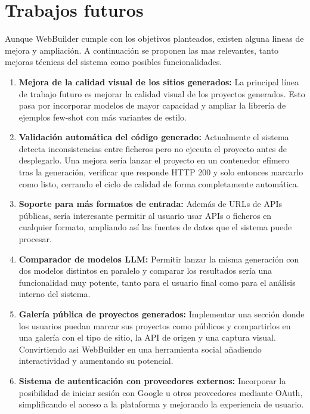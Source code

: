 \section{Trabajos futuros}
\label{sec:trabajos_futuros}

Aunque WebBuilder cumple con los objetivos planteados, existen alguna lineas de mejora y ampliación. A continuación se proponen las mas relevantes, tanto mejoras técnicas del sistema como posibles funcionalidades.

\begin{enumerate}
  \item \textbf{Mejora de la calidad visual de los sitios generados:} La principal línea de trabajo futuro es mejorar la calidad visual de los proyectos generados. Esto pasa por incorporar modelos de mayor capacidad y ampliar la librería de ejemplos few-shot con más variantes de estilo.
  
  \item \textbf{Validación automática del código generado:} Actualmente el sistema detecta inconsistencias entre ficheros pero no ejecuta el proyecto antes de desplegarlo. Una mejora sería lanzar el proyecto en un contenedor efímero tras la generación, verificar que responde HTTP 200 y solo entonces marcarlo como listo, cerrando el ciclo de calidad de forma completamente automática.
  
  \item \textbf{Soporte para más formatos de entrada:} Además de URLs de APIs públicas, sería interesante permitir al usuario usar APIs o ficheros en cualquier formato, ampliando así las fuentes de datos que el sistema puede procesar.
  
  \item \textbf{Comparador de modelos LLM:} Permitir lanzar la misma generación con dos modelos distintos en paralelo y comparar los resultados sería una funcionalidad muy potente, tanto para el usuario final como para el análisis interno del sistema.
  
  \item \textbf{Galería pública de proyectos generados:} Implementar una sección donde los usuarios puedan marcar sus proyectos como públicos y compartirlos en una galería con el tipo de sitio, la API de origen y una captura visual. Convirtiendo asi WebBuilder en una herramienta social añadiendo interactividad y aumentando su potencial.
  
  \item \textbf{Sistema de autenticación con proveedores externos:} Incorporar la posibilidad de iniciar sesión con Google u otros proveedores mediante OAuth, simplificando el acceso a la plataforma y mejorando la experiencia de usuario.
\end{enumerate}